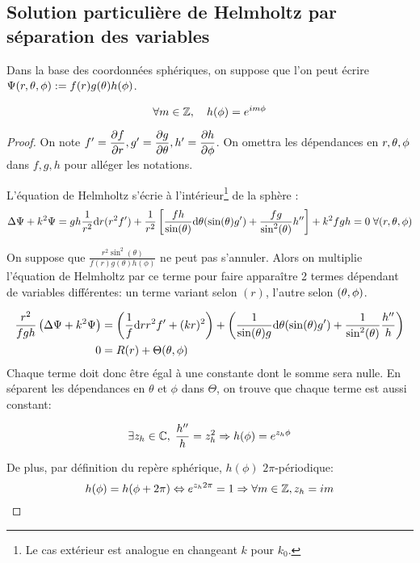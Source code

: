 \subsection{Solution particulière de Helmholtz par séparation des variables}
\begin{hyp}
Dans la base des coordonnées sphériques, on suppose que l'on peut écrire $\Psi(\rtp) : = f(r)g(\theta)h(\phi)$. 
\end{hyp}
\begin{prop}
\begin{equation}
\forall m \in \Z, \quad h(\phi) = e^{im\phi}
\end{equation}
\end{prop}
\begin{proof}
On note $f' =\dr{r}{f}, g' = \dr{\theta}{g} , h' = \dr{\phi}{h}$. On omettra les dépendances en $\rtp$ dans $f,g,h$ pour alléger les notations.

L'équation de Helmholtz s'écrie à l'intérieur\footnote{Le cas extérieur est analogue en changeant $k$ pour $k_0$.} de la sphère : 
\begin{equation}\label{eq_helm_helm}
  \Delta \Psi + k^2 \Psi = gh\frac{1}{r^2}\dd{r}(r^2f') + \frac{1}{r^2}\left[\frac{fh}{\sin(\theta)}\dd{\theta}(\sin(\theta)g')+\frac{fg}{\sin^2(\theta)}h''\right] + k^2 fgh = 0 \; \forall (r,\tp)
\end{equation}

On suppose que $ \frac{r^2\sin^2(\theta)}{f(r)g(\theta)h(\phi)}$ ne peut pas s'annuler. Alors on multiplie l'équation de Helmholtz par ce terme pour faire apparaître 2 termes dépendant de variables différentes: un terme variant selon $(r)$, l'autre selon $(\tp)$. 

\begin{align*}
\frac{r^2}{fgh} \left(\Delta \Psi + k^2 \Psi\right) &= 
\left(\frac{1}{f}\dd{r}{r^2f'} + (kr)^2\right) + 
\left(\frac{1}{ \sin(\theta)g} \dd{\theta}(\sin(\theta)g') +  \frac{1}{ \sin^2(\theta)}\frac{h''}{h} \right)\\
0 &=R(r) + \Theta(\tp)
\end{align*}
Chaque terme doit donc être égal à une constante dont le somme sera nulle. En séparent les dépendances en $\theta$ et $\phi$ dans $\Theta$, on trouve que chaque terme est aussi constant:

\[ 
\exists z_h \in \C,\; \frac{h''}{h} = z_h^2 \Rightarrow h(\phi) = e^{z_h\phi}
\]

De plus, par définition du repère sphérique, $h(\phi)$ $2\pi$-périodique:
\[
h(\phi) = h(\phi + 2\pi) \Leftrightarrow e^{z_h2\pi}= 1 \Rightarrow \forall m \in \Z, z_h = im
\]
\end{proof}

